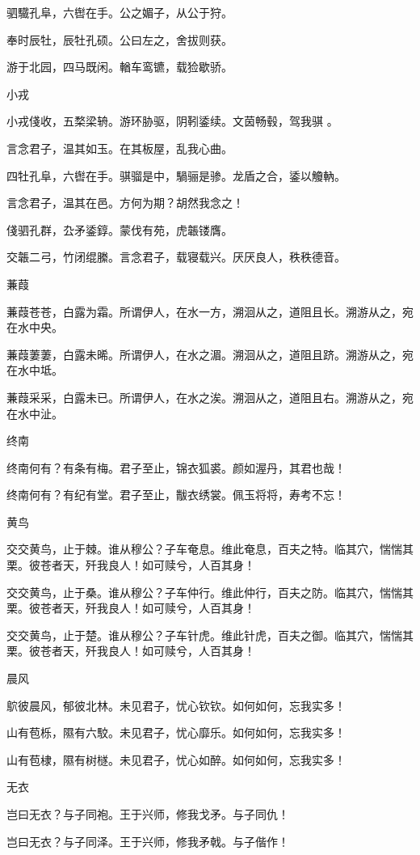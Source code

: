 驷驖孔阜，六辔在手。公之媚子，从公于狩。

奉时辰牡，辰牡孔硕。公曰左之，舍拔则获。

游于北园，四马既闲。輶车鸾镳，载猃歇骄。

小戎

小戎俴收，五楘梁辀。游环胁驱，阴靷鋈续。文茵畅毂，驾我骐 。

言念君子，温其如玉。在其板屋，乱我心曲。

四牡孔阜，六辔在手。骐骝是中，騧骊是骖。龙盾之合，鋈以觼軜。

言念君子，温其在邑。方何为期？胡然我念之！

俴驷孔群，厹矛鋈錞。蒙伐有苑，虎韔镂膺。

交韔二弓，竹闭绲縢。言念君子，载寝载兴。厌厌良人，秩秩德音。

蒹葭

蒹葭苍苍，白露为霜。所谓伊人，在水一方，溯洄从之，道阻且长。溯游从之，宛在水中央。

蒹葭萋萋，白露未晞。所谓伊人，在水之湄。溯洄从之，道阻且跻。溯游从之，宛在水中坻。

蒹葭采采，白露未已。所谓伊人，在水之涘。溯洄从之，道阻且右。溯游从之，宛在水中沚。

终南

终南何有？有条有梅。君子至止，锦衣狐裘。颜如渥丹，其君也哉！

终南何有？有纪有堂。君子至止，黻衣绣裳。佩玉将将，寿考不忘！

黄鸟

交交黄鸟，止于棘。谁从穆公？子车奄息。维此奄息，百夫之特。临其穴，惴惴其栗。彼苍者天，歼我良人！如可赎兮，人百其身！

交交黄鸟，止于桑。谁从穆公？子车仲行。维此仲行，百夫之防。临其穴，惴惴其栗。彼苍者天，歼我良人！如可赎兮，人百其身！

交交黄鸟，止于楚。谁从穆公？子车针虎。维此针虎，百夫之御。临其穴，惴惴其栗。彼苍者天，歼我良人！如可赎兮，人百其身！

晨风

鴥彼晨风，郁彼北林。未见君子，忧心钦钦。如何如何，忘我实多！

山有苞栎，隰有六駮。未见君子，忧心靡乐。如何如何，忘我实多！

山有苞棣，隰有树檖。未见君子，忧心如醉。如何如何，忘我实多！

无衣

岂曰无衣？与子同袍。王于兴师，修我戈矛。与子同仇！

岂曰无衣？与子同泽。王于兴师，修我矛戟。与子偕作！

